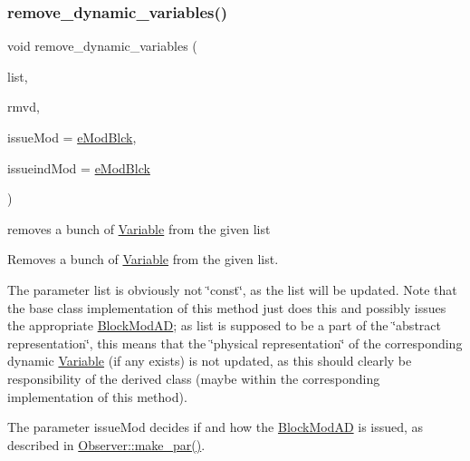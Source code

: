 \subsubsection{\texorpdfstring{remove\+\_\+dynamic\+\_\+variables()}{remove\_dynamic\_variables()}\hspace{0.1cm}{\footnotesize\ttfamily [1/2]}}
{\footnotesize\ttfamily void remove\+\_\+dynamic\+\_\+variables (\begin{DoxyParamCaption}\item[{std\+::list$<$ Var $>$ \&}]{list,  }\item[{std\+::vector$<$ typename std\+::list$<$ Var $>$\+::const\+\_\+iterator $>$ \&}]{rmvd,  }\item[{\mbox{\hyperlink{group___modification___t_y_p_e_s_ga544246d8c462e9a2d817c2c30797968f}{c\+\_\+\+Mod\+Param}}}]{issue\+Mod = {\ttfamily \mbox{\hyperlink{group___modification___t_y_p_e_s_gga48fddcdd03a03f49b7e389ca1ed938d4a21b14b26b1c0093a0905f6fc010bad29}{e\+Mod\+Blck}}},  }\item[{\mbox{\hyperlink{group___modification___t_y_p_e_s_ga544246d8c462e9a2d817c2c30797968f}{c\+\_\+\+Mod\+Param}}}]{issueind\+Mod = {\ttfamily \mbox{\hyperlink{group___modification___t_y_p_e_s_gga48fddcdd03a03f49b7e389ca1ed938d4a21b14b26b1c0093a0905f6fc010bad29}{e\+Mod\+Blck}}} }\end{DoxyParamCaption})}



removes a bunch of \mbox{\hyperlink{class_s_m_spp__di__unipi__it_1_1_variable}{Variable}} from the given list 

Removes a bunch of \mbox{\hyperlink{class_s_m_spp__di__unipi__it_1_1_variable}{Variable}} from the given list.

The parameter list is obviously not \char`\"{}const\char`\"{}, as the list will be updated. Note that the base class implementation of this method just does this and possibly issues the appropriate \mbox{\hyperlink{class_s_m_spp__di__unipi__it_1_1_block_mod_a_d}{Block\+Mod\+AD}}; as list is supposed to be a part of the \char`\"{}abstract representation\char`\"{}, this means that the \char`\"{}physical
representation\char`\"{} of the corresponding dynamic \mbox{\hyperlink{class_s_m_spp__di__unipi__it_1_1_variable}{Variable}} (if any exists) is not updated, as this should clearly be responsibility of the derived class (maybe within the corresponding implementation of this method).

The parameter issue\+Mod decides if and how the \mbox{\hyperlink{class_s_m_spp__di__unipi__it_1_1_block_mod_a_d}{Block\+Mod\+AD}} is issued, as described in \mbox{\hyperlink{class_s_m_spp__di__unipi__it_1_1_observer_a2d499ae38e5e95cf66cd71da32b0694a}{Observer\+::make\+\_\+par()}}.


